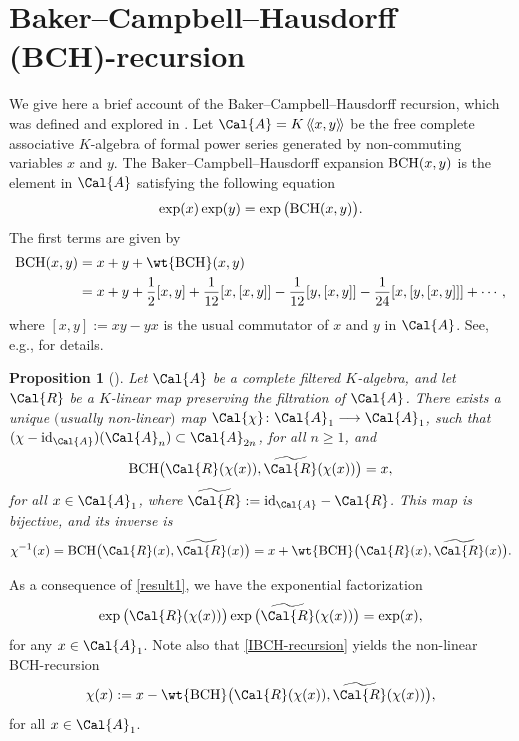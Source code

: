 \documentclass[pdftex]{sigma}
\numberwithin{equation}{section}
\newtheorem{Proposition}[Theorem]{Proposition}
 { \theoremstyle{definition}
\newtheorem{Definition}[Theorem]{Definition}
\newtheorem{Note}[Theorem]{Note}
\newtheorem{Example}[Theorem]{Example}
\newtheorem{Remark}[Theorem]{Remark} }
\begin{document}
\section{Baker--Campbell--Hausdorff (BCH)-recursion}\label{s2}

We give here a brief account of the Baker--Campbell--Hausdorff recursion, which was defined and explored in \cite{KLK04, KLK05, KLM06}. Let $\Cal{A} = K\left\langle\!\left\langle x, y \right\rangle\!\right\rangle$ be the free complete associative $K$-algebra of formal power series generated by non-commuting variables $x$ and $y$. The Baker--Campbell--Hausdorff expansion ${\rm BCH}(x, y)$ is the element in $\Cal{A}$ satisfying the following equation
\begin{displaymath}
\exp(x)\exp(y) = \exp\big({\rm BCH}(x, y)\big).
\end{displaymath}
The first terms are given by
\begin{align*}
{\rm BCH}(x, y)
&= x+y+\wt{{\rm BCH}}(x,y)\\
&=x+y+\frac{1}{2} [x, y] + \frac{1}{12}[x, [x, y]] - \frac{1}{12}[y, [x, y]]
-\frac{1}{24} [x, [y, [x, y]]] + \cdots,
\end{align*}
where $[x, y] := xy-yx$ is the usual commutator of $x$ and $y$ in $\Cal{A}$. See, e.g., \cite{BF12} for details.

\begin{Proposition}[{\cite[Proposition $1$]{KLM06}}]
Let $\Cal{A}$ be a complete filtered $K$-algebra, and let $\Cal{R}$ be a $K$-linear map preserving the filtration of $\Cal{A}$. There exists a unique $($usually non-linear$)$ map $\Cal{\chi}\colon \Cal{A}_1 \longrightarrow \Cal{A}_1$, such that $(\chi - {\rm id}_{\Cal{A}})(\Cal{A}_n) \subset \Cal{A}_{2n}$, for all $n \geq 1$, and
\begin{equation}
\label{result1}
{\rm BCH}\big(\Cal{R}(\chi(x)), \widetilde{\Cal{R}}(\chi(x))\big) = x,
\end{equation}
for all $x \in \Cal{A}_1$, where $\widetilde{\Cal{R}} := {\rm id}_{\Cal{A}} - \Cal{R}$. This map is bijective, and its inverse is
\begin{equation}
\label{IBCH-recursion}
\chi^{-1}(x)
= {\rm BCH}\big(\Cal{R}(x), \widetilde{\Cal{R}}(x)\big)
= x + \wt{{\rm BCH}}\big(\Cal{R}(x), \widetilde{\Cal{R}}(x)\big).
\end{equation}
\end{Proposition}

As a consequence of \eqref{result1}, we have the exponential factorization
\begin{equation}\label{exp-fact}
\exp\big(\Cal{R}(\chi(x))\big)\exp\big(\widetilde{\Cal{R}}(\chi(x))\big) = \exp(x),
\end{equation}
for any $x \in \Cal{A}_1$. Note also that \eqref{IBCH-recursion} yields the non-linear BCH-recursion
\begin{equation}
\label{BCH-recursion}
\chi(x) := x - \wt{{\rm BCH}}\big(\Cal{R}(\chi(x)), \widetilde{\Cal{R}}(\chi(x))\big),
\end{equation}
for all $x \in \Cal{A}_1$.
\end{document}

